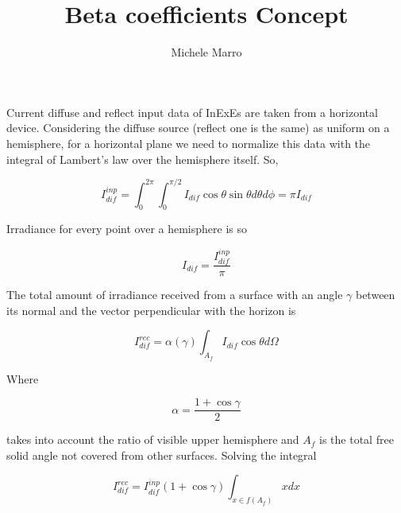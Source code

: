 \documentclass[a4paper]{article}
\title{Beta coefficients Concept}
\author{Michele Marro}
\begin{document}
\maketitle

Current diffuse and reflect input data of InExEs are taken from a horizontal device. Considering the diffuse source (reflect one is the same) as uniform on a hemisphere, for a horizontal plane we need to normalize this data with the integral of Lambert's law over the hemisphere itself. So,

\begin{equation}
I_{dif}^{inp} = \int_{0}^{2 \pi} \int_{0}^{\pi / 2} I_{dif} \cos \theta \sin \theta d \theta d \phi = \pi I_{dif} 
\end{equation}

Irradiance for every point over a hemisphere is so

\begin{equation}
I_{dif} = \frac{I_{dif}^{inp}}{\pi}
\end{equation}

The total amount of irradiance received from a surface with an angle $\gamma$ between its normal and the vector perpendicular with the horizon is

\begin{equation}
I_{dif}^{rec} = \alpha( \gamma )  \int_{A_f} I_{dif} \cos \theta d \Omega
\end{equation}

Where 

\begin{equation}
\alpha = \frac{1 + \cos \gamma}{2}
\end{equation}

takes into account the ratio of visible upper hemisphere and $A_f$ is the total free solid angle not covered from other surfaces. Solving the integral

\begin{equation}
I_{dif}^{rec} = I_{dif}^{inp} (1 + \cos \gamma) \int_{x \in f(A_f)} x d x
\end{equation}
\end{document}

